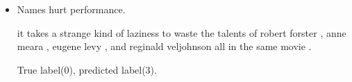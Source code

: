 \documentclass[11pt]{article}
\begin{document}
\begin{enumerate}[(a)]
\begin{itemize}
\begin{center}
\begin{varwidth}{.7\textwidth}
  \end{varwidth}
    \end{center}
True label(0), predicted label(3).
    \item Names hurt performance.
    \begin{center} 
      \begin{varwidth}{.7\textwidth}
    {\small it takes a strange kind of laziness to waste the talents of robert forster , anne meara , eugene levy , and reginald veljohnson all in the same movie .}              
      \end{varwidth}
    \end{center}
    True label(0), predicted label(3).
  \end{itemize}
\end{enumerate}
\end{document}

